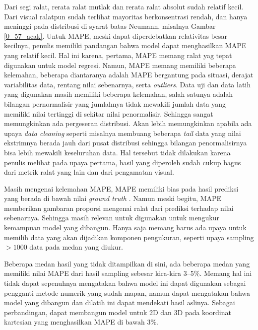 Dari segi ralat, rerata ralat mutlak dan rerata ralat absolut sudah relatif kecil. Dari visual ralatpun sudah terlihat mayoritas berkonsentrasi rendah, dan hanya meninggi pada distribusi di syarat batas Neumann, misalnya Gambar \ref{0_57_acak}. Untuk MAPE, meski dapat diperdebatkan relativitas besar kecilnya, penulis memiliki pandangan bahwa model dapat menghasilkan MAPE yang relatif kecil. Hal ini karena, pertama, MAPE memang ralat yag tepat digunakan untuk model regresi. Namun, MAPE memang memiliki beberapa kelemahan, beberapa diantaranya adalah MAPE bergantung pada situasi, derajat variabilitas data, rentang nilai sebenarnya, serta \textit{outliers}. Data uji dan data latih yang digunakan masih memiliki beberapa kelemahan, salah satunya adalah bilangan pernormalisir yang jumlahnya tidak mewakili jumlah data yang memiliki nilai tertinggi di sekitar nilai penormalisir. Sehingga sangat memungkinkan ada pergeseran distribusi. Akan lebih memungkinkan apabila ada upaya \textit{data cleaning} seperti misalnya membuang beberapa \textit{tail} data yang nilai ekstrimnya berada jauh dari pusat distribusi sehingga bilangan penormalisirnya bisa lebih mewakili keseluruhan data. Hal tersebut tidak dilakukan karena penulis melihat pada upaya pertama, hasil yang diperoleh sudah cukup bagus dari metrik ralat yang lain dan dari pengamatan visual.

Masih mengenai kelemahan MAPE, MAPE memiliki bias pada hasil prediksi yang berada di bawah nilai \textit{ground truth} \citep{roberts_2023b}. Namun meski begitu, MAPE memberikan gambaran proporsi mengenai ralat dari prediksi terhadap nilai sebenarnya. Sehingga masih relevan untuk digunakan untuk mengukur kemampuan model yang dibangun. Hanya saja memang harus ada upaya untuk memilih data yang akan dijadikan komponen pengukuran, seperti upaya sampling $>1000$ data pada medan yang diukur. 

Beberapa medan hasil yang tidak ditampilkan di sini, ada beberapa medan yang memiliki nilai MAPE dari hasil sampling sebesar kira-kira 3--5\%. Memang hal ini tidak dapat sepenuhnya mengatakan bahwa model ini dapat digunakan sebagai pengganti metode numerik yang sudah mapan, namun dapat mengatakan bahwa model yang dibangun dan dilatih ini dapat mendekati hasil aslinya. Sebagai perbandingan, \cite{Ozbay2021} dapat membangun model untuk 2D dan 3D pada koordinat kartesian yang menghasilkan MAPE di bawah 3\%.

